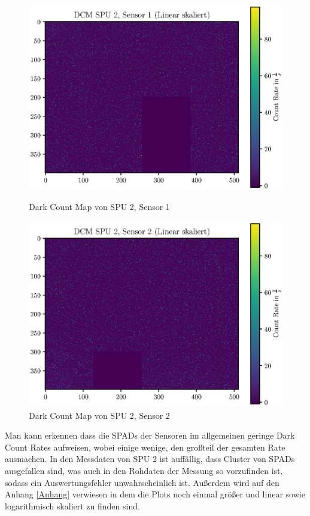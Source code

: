 \documentclass[12pt,twoside,a4paper]{scrartcl}
\begin{document}
			\begin{figure}[H]
				\begin{minipage}{0.49 \textwidth}
					\includegraphics[width = \textwidth]{Plots/DCM/DCM_SPU2_Sensor1_lin.eps}
					\caption{Dark Count Map von SPU 2, Sensor 1}
				\end{minipage}
				\begin{minipage}{0.49 \textwidth}
					\includegraphics[width = \textwidth]{Plots/DCM/DCM_SPU2_Sensor2_lin.eps}
					\caption{Dark Count Map von SPU 2, Sensor 2}
				\end{minipage}
			\end{figure}
			Man kann erkennen dass die SPADs der Sensoren im allgemeinen geringe Dark Count Rates aufweisen, wobei einige wenige, den großteil der gesamten Rate ausmachen.
			In den Messdaten von SPU 2 ist auffällig, dass Cluster von SPADs ausgefallen sind, was auch in den Rohdaten der Messung so vorzufinden ist, sodass ein Auswertungsfehler unwahrscheinlich ist.
			Außerdem wird auf den Anhang \ref{Anhang} verwiesen in dem die Plots noch einmal größer und linear sowie logarithmisch skaliert zu finden sind.
\end{document}
